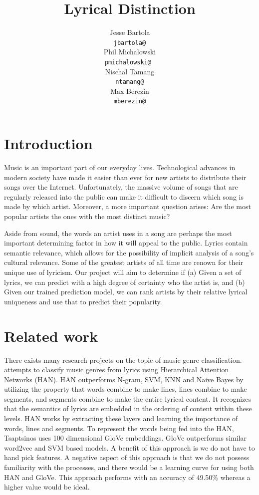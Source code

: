 \documentclass[11pt,a4paper]{article}
\title{Lyrical Distinction}
\author{Jesse Bartola \\
  {\tt jbartola@} \\\And
  Phil Michalowski \\
  {\tt pmichalowski@ } \\\And
  Nischal Tamang \\
  {\tt ntamang@} \\\And
  Max Berezin \\
  {\tt mberezin@} \\}
\date{}
\begin{document}
\maketitle

\section{Introduction}
Music is an important part of our everyday lives. Technological advances in modern society have made it easier than ever for new artists to distribute their songs over the Internet. Unfortunately, the massive volume of songs that are regularly released into the public can make it difficult to discern which song is made by which artist. Moreover, a more important question arises: Are the most popular artists the ones with the most distinct music?

Aside from sound, the words an artist uses in a song are perhaps the most important determining factor in how it will appeal to the public. 
Lyrics contain semantic relevance, which allows for the possibility of implicit analysis of a song's cultural relevance. 
Some of the greatest artists of all time are renown for their unique use of lyricism. Our project will aim to determine if (a) Given a set of lyrics, we can predict with a high degree of certainty who the artist is, and (b) Given our trained prediction model, we can rank artists by their relative lyrical uniqueness and use that to predict their popularity.


\section{Related work}
There exists many research projects on the topic of music genre classification.  attempts to classify music genres from lyrics using Hierarchical Attention Networks (HAN). 
HAN outperforms N-gram, SVM, KNN and Naive Bayes by utilizing the property that words combine to make lines, lines combine to make segments, and segments combine to make the entire lyrical content.
It recognizes that the semantics of lyrics are embedded in the ordering of content within these levels. 
HAN works by extracting these layers and learning the importance of words, lines and segments. 
To represent the words being fed into the HAN, Tsaptsinos uses 100 dimensional GloVe embeddings. 
GloVe outperforms similar word2vec and SVM based models. 
A benefit of this approach is we do not have to hand pick features.
A negative aspect of this approach is that we do not possess familiarity with the processes, and there would be a learning curve for using both HAN and GloVe. 
This approach performs with an accuracy of 49.50\% whereas a higher value would be ideal. 
\end{document}
